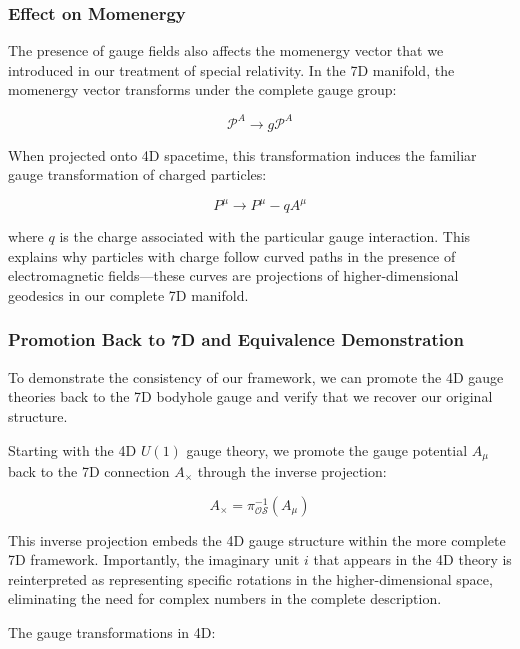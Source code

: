 \documentclass{article}
\begin{document}
\subsubsection{Effect on Momenergy}

The presence of gauge fields also affects the momenergy vector that we introduced in our treatment of special relativity. In the 7D manifold, the momenergy vector transforms under the complete gauge group:

\begin{equation}
\mathcal{P}^A \rightarrow g \mathcal{P}^A
\end{equation}

When projected onto 4D spacetime, this transformation induces the familiar gauge transformation of charged particles:

\begin{equation}
P^{\mu} \rightarrow P^{\mu} - q A^{\mu}
\end{equation}

where $q$ is the charge associated with the particular gauge interaction. This explains why particles with charge follow curved paths in the presence of electromagnetic fields—these curves are projections of higher-dimensional geodesics in our complete 7D manifold.

\subsubsection{Promotion Back to 7D and Equivalence Demonstration}

To demonstrate the consistency of our framework, we can promote the 4D gauge theories back to the 7D bodyhole gauge and verify that we recover our original structure.

Starting with the 4D $U(1)$ gauge theory, we promote the gauge potential $A_{\mu}$ back to the 7D connection $A_{\times}$ through the inverse projection:

\begin{equation}
A_{\times} = \pi^{-1}_{\mathcal{OS}}(A_{\mu})
\end{equation}

This inverse projection embeds the 4D gauge structure within the more complete 7D framework. Importantly, the imaginary unit $i$ that appears in the 4D theory is reinterpreted as representing specific rotations in the higher-dimensional space, eliminating the need for complex numbers in the complete description.

The gauge transformations in 4D:
\end{document}
